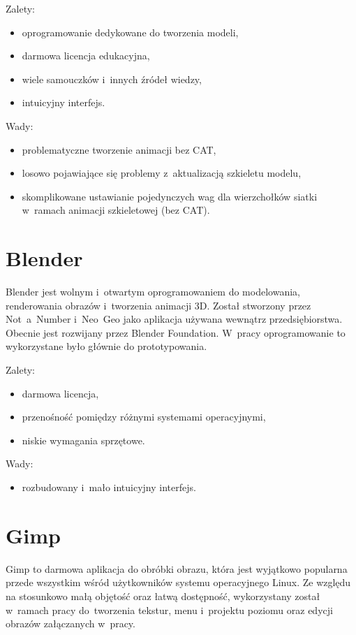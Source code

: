 {\raggedright Zalety:
\begin{itemize}
\item oprogramowanie dedykowane do tworzenia modeli,
\item darmowa licencja edukacyjna,
\item wiele samouczków i~innych źródeł wiedzy,
\item intuicyjny interfejs.
\end{itemize}

Wady:
\begin{itemize}
\item problematyczne tworzenie animacji bez CAT,
\item losowo pojawiające się problemy z~aktualizacją szkieletu modelu,
\item skomplikowane ustawianie pojedynczych wag dla wierzchołków siatki w~ramach animacji szkieletowej (bez CAT).
\end{itemize}
}

\section{Blender}
Blender jest wolnym i~otwartym oprogramowaniem do modelowania, renderowania obrazów i~tworzenia animacji 3D. Został stworzony przez Not~a~Number i~Neo~Geo jako aplikacja używana wewnątrz przedsiębiorstwa. Obecnie jest rozwijany przez Blender Foundation. W~pracy oprogramowanie to wykorzystane było głównie do prototypowania.

{\raggedright
Zalety:
\begin{itemize}
\item darmowa licencja,
\item przenośność pomiędzy różnymi systemami operacyjnymi,
\item niskie wymagania sprzętowe.
\end{itemize}

Wady:
\begin{itemize}
\item rozbudowany i~mało intuicyjny interfejs.
\end{itemize}
}

\section{Gimp}

Gimp to darmowa aplikacja do obróbki obrazu, która jest wyjątkowo popularna przede wszystkim wśród użytkowników systemu operacyjnego Linux. Ze względu na stosunkowo małą objętość oraz łatwą dostępność, wykorzystany został w~ramach pracy do~tworzenia tekstur, menu i~projektu poziomu oraz edycji obrazów załączanych w~pracy.

